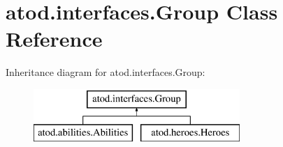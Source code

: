 \hypertarget{classatod_1_1interfaces_1_1_group}{}\section{atod.\+interfaces.\+Group Class Reference}
\label{classatod_1_1interfaces_1_1_group}
Inheritance diagram for atod.\+interfaces.\+Group\+:\begin{figure}[H]
\begin{center}
\leavevmode
\includegraphics[height=2.000000cm]{classatod_1_1interfaces_1_1_group}
\end{center}
\end{figure}

